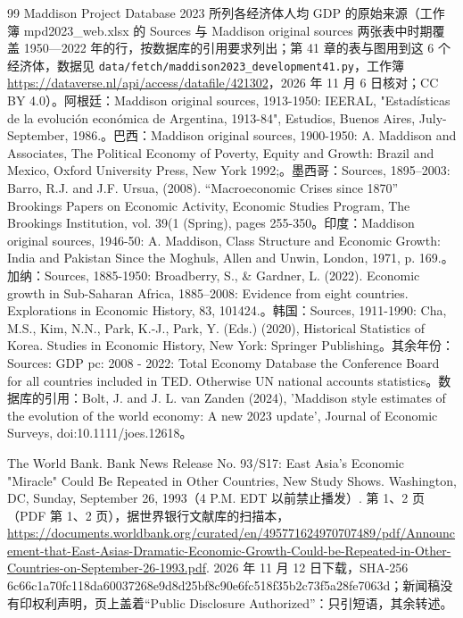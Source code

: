 \begin{thebibliography}{99}
 Maddison Project Database 2023 所列各经济体人均 GDP 的原始来源（工作簿 mpd2023\_web.xlsx 的 Sources 与 Maddison original sources 两张表中时期覆盖 1950—2022 年的行，按数据库的引用要求列出；第 41 章的表与图用到这 6 个经济体，数据见 \texttt{data/fetch/maddison2023\_development41.py}，工作簿 \url{https://dataverse.nl/api/access/datafile/421302}，2026 年 11 月 6 日核对；CC BY 4.0）。阿根廷：Maddison original sources, 1913-1950: IEERAL, "Estadísticas de la evolución económica de Argentina, 1913-84", Estudios, Buenos Aires, July-September, 1986.。巴西：Maddison original sources, 1900-1950: A. Maddison and Associates, The Political Economy of Poverty, Equity and Growth: Brazil and Mexico, Oxford University Press, New York 1992;。墨西哥：Sources, 1895–2003: Barro, R.J. and J.F. Ursua, (2008). “Macroeconomic Crises since 1870” Brookings Papers on Economic Activity, Economic Studies Program, The Brookings Institution, vol. 39(1 (Spring), pages 255-350。印度：Maddison original sources, 1946-50: A. Maddison, Class Structure and Economic Growth: India and Pakistan Since the Moghuls, Allen and Unwin, London, 1971, p. 169.。加纳：Sources, 1885-1950: Broadberry, S., \& Gardner, L. (2022). Economic growth in Sub-Saharan Africa, 1885–2008: Evidence from eight countries. Explorations in Economic History, 83, 101424.。韩国：Sources, 1911-1990: Cha, M.S., Kim, N.N., Park, K.-J., Park, Y. (Eds.) (2020), Historical Statistics of Korea. Studies in Economic History, New York: Springer Publishing。其余年份：Sources: GDP pc: 2008 - 2022: Total Economy Database the Conference Board for all countries included in TED. Otherwise UN national accounts statistics。数据库的引用：Bolt, J. and J. L. van Zanden (2024), 'Maddison style estimates of the evolution of the world economy: A new 2023 update', Journal of Economic Surveys, doi:10.1111/joes.12618。

 The World Bank. Bank News Release No. 93/S17: East Asia's Economic "Miracle" Could Be Repeated in Other Countries, New Study Shows. Washington, DC, Sunday, September 26, 1993（4 P.M. EDT 以前禁止播发）. 第 1、2 页（PDF 第 1、2 页），据世界银行文献库的扫描本，\url{https://documents.worldbank.org/curated/en/495771624970707489/pdf/Announcement-that-East-Asias-Dramatic-Economic-Growth-Could-be-Repeated-in-Other-Countries-on-September-26-1993.pdf}. 2026 年 11 月 12 日下载，SHA-256 6c66c1a70fc118da60037268e9d8d25bf8c90e6fc518f35b2c73f5a28fe7063d；新闻稿没有印权利声明，页上盖着“Public Disclosure Authorized”：只引短语，其余转述。


\end{thebibliography}
